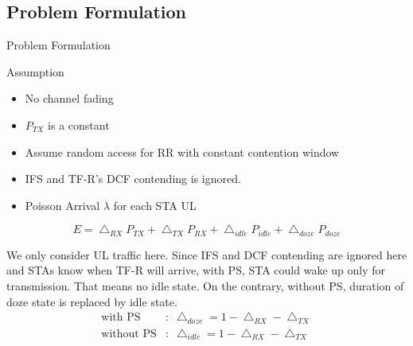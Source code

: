 \documentclass[10pt]{beamer}
\begin{document}
\subsection{Problem Formulation}
\begin{frame}{Problem Formulation}
	\begin{block}{Assumption}
	\begin{itemize}
		\item 
		No channel fading
		\item
		$P_{TX}$ is a constant
		\item
		Assume random access for RR with constant contention window
		\item
		IFS and TF-R's DCF contending is ignored.
		\item
		Poisson Arrival $\lambda$ for each STA UL
	\end{itemize}    
    \end{block}
\begin{equation}
\label{equ_energy}
E = \bigtriangleup_{RX}P_{TX} + \bigtriangleup_{TX}P_{RX} + \bigtriangleup_{idle}P_{idle} + \bigtriangleup_{doze}P_{doze} 
\end{equation}

We only consider UL traffic here. 
Since IFS and DCF contending are ignored here and STAs know when TF-R will arrive, 
with PS, STA could wake up only for transmission. That means no idle state. 
On the contrary, without PS, duration of doze state is replaced by idle state. 
\begin{align}
\label{equ_idle}
\text{with PS}	 &: \; \bigtriangleup_{doze} = 1 - \bigtriangleup_{RX} - \bigtriangleup_{TX} \\
\label{equ_doze}
\text{without PS} &:\; \bigtriangleup_{idle} = 1 - \bigtriangleup_{RX} - \bigtriangleup_{TX} 
\end{align}
\end{frame}
\end{document}
